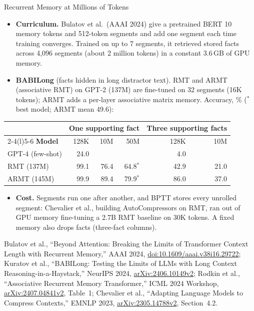 \begin{frame}{Recurrent Memory at Millions of Tokens}
  \begin{itemize}\footnotesize\itemsep0.3em
    \item[\textcolor{red}{$\blacktriangleright$}] \textbf{Curriculum.} Bulatov et al.\ (AAAI 2024) give a pretrained BERT 10 memory tokens and 512-token segments and add one segment each time training converges. Trained on up to 7 segments, it retrieved stored facts across 4,096 segments (about 2 million tokens) in a constant 3.6\,GB of GPU memory.
    \item[\textcolor{red}{$\blacktriangleright$}] \textbf{BABILong} (facts hidden in long distractor text). RMT and ARMT (associative RMT) on GPT-2 (137M) are fine-tuned on 32 segments (16K tokens); ARMT adds a per-layer associative matrix memory. Accuracy, \% ($^{*}$\,best model; ARMT mean 49.6):
  \end{itemize}
  \vspace{0.1em}
  {\centering\scriptsize
  \begin{tabular}{@{}l rrr rr@{}}
    \toprule
     & \multicolumn{3}{c}{\textbf{One supporting fact}} & \multicolumn{2}{c}{\textbf{Three supporting facts}} \\
    \cmidrule(lr){2-4}\cmidrule(l){5-6}
    \textbf{Model} & 128K & 10M & 50M & 128K & 10M \\
    \midrule
    GPT-4 (few-shot) & 24.0 & & & 4.0 & \\
    RMT (137M) & 99.1 & 76.4 & 64.8$^{*}$ & 42.9 & 21.0 \\
    ARMT (145M) & 99.9 & 89.4 & 79.9$^{*}$ & 86.0 & 37.0 \\
    \bottomrule
  \end{tabular}\par}
  \begin{itemize}\footnotesize\itemsep0.3em
    \item[\textcolor{red}{$\blacktriangleright$}] \textbf{Cost.} Segments run one after another, and BPTT stores every unrolled segment: Chevalier et al., building AutoCompressors on RMT, ran out of GPU memory fine-tuning a 2.7B RMT baseline on 30K tokens. A fixed memory also drops facts (three-fact columns).
  \end{itemize}
  \vspace{0.1em}
  {\scriptsize Bulatov et al., ``Beyond Attention: Breaking the Limits of Transformer Context Length with Recurrent Memory,'' AAAI 2024, \href{https://doi.org/10.1609/aaai.v38i16.29722}{doi:10.1609/aaai.v38i16.29722}; Kuratov et al., ``BABILong: Testing the Limits of LLMs with Long Context Reasoning-in-a-Haystack,'' NeurIPS 2024, \href{https://arxiv.org/abs/2406.10149v2}{arXiv:2406.10149v2}; Rodkin et al., ``Associative Recurrent Memory Transformer,'' ICML 2024 Workshop, \href{https://arxiv.org/abs/2407.04841v2}{arXiv:2407.04841v2}, Table~1; Chevalier et al., ``Adapting Language Models to Compress Contexts,'' EMNLP 2023, \href{https://arxiv.org/abs/2305.14788v2}{arXiv:2305.14788v2}, Section~4.2.\par}
\end{frame}
